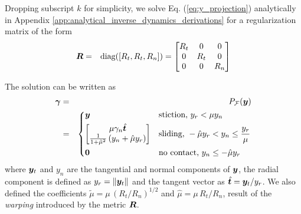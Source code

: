Dropping subscript $k$ for simplicity, we solve Eq. (\ref{eq:y_projection})
analytically in Appendix \ref{app:analytical_inverse_dynamics_derivations} for a
regularization matrix of the form
\begin{eqnarray}	
	\vf{R} &=& \text{diag}([R_t, R_t, R_n]) = 
	\begin{bmatrix}
		R_t &   0 & 0\\
		  0 & R_t & 0\\
		  0 &   0 & R_n
	\end{bmatrix}
    \label{eq:Rk}
\end{eqnarray} 

The solution can be written as
\begin{eqnarray}
	\bgamma &=& P_\mathcal{F}(\vf{y})
    \label{eq:analytical_y_projection}\\
    &=&\begin{dcases}
	\vf{y} 
	& \text{stiction, } y_r < \mu y_n\\
	\begin{bmatrix}
		\mu\gamma_n\hat{\vf{t}}\\
		\frac{1}{1+\tilde\mu^2}\left(y_n +
        \hat\mu y_r\right)
	\end{bmatrix}
	& \text{sliding, } -\hat\mu y_r < y_n \leq \frac{y_r}{\mu}\\
    \vf{0} & \text{no contact, } y_n \leq -\hat\mu y_r
\end{dcases}\nonumber	
\end{eqnarray}
where ${\bm{y}}_t$ and $y_n$ are the tangential and normal components of ${\bm{y}}$,
the radial component is defined as $y_r=\Vert{\bm{y}}_t\Vert$ and the tangent
vector as $\hat{{\bm{t}}}={\bm{y}}_t/y_r$. We also defined the
coefficients $\tilde\mu=\mu\,(R_t/R_n)^{1/2}$ and $\hat\mu=\mu\,R_t/R_n$, result
of the \textit{warping} introduced by the metric ${\bm{R}}$.
